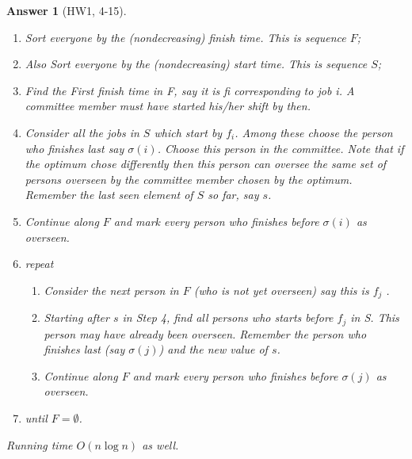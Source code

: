 \documentclass[11pt]{article}
\theoremstyle{numberplain}
\theoremstyle{nonumberplain}
\newtheorem{ans}{Answer}
\newcommand{\0}{{\mathbf{0}}}
\begin{document}
\begin{ans}[HW1, 4-15]

\begin{enumerate}
\item Sort everyone by the (nondecreasing) finish time. This is sequence $F$;
\item Also Sort everyone by the (nondecreasing) start time. This is sequence $S$;
\item Find the First finish time in F, say it is fi corresponding to job i. A committee member must have
started his/her shift by then.
\item Consider all the jobs in $S$ which start by $f_i$. Among these choose the person who finishes last say $\sigma(i)$.
Choose this person in the committee. Note that if the optimum chose differently then this person can
oversee the same set of persons overseen by the committee member chosen by the optimum. Remember
the last seen element of $S$ so far, say $s$.
\item  Continue along $F$ and mark every person who finishes before $\sigma(i)$ as overseen.
\item  repeat
\begin{enumerate}
\item Consider the next person in $F$ (who is not yet overseen) say this is $f_j$ .
\item Starting after $s$ in Step 4, find all persons who starts before $f_j$ in S. This person may have already
been overseen. Remember the person who finishes last (say $\sigma(j)$) and the new value of $s$.
\item Continue along $F$ and mark every person who finishes before $\sigma(j)$ as overseen.
\end{enumerate}
\item until $F =\emptyset $.
\end{enumerate}
Running time $O(n\log n)$ as well.
\end{ans}
\end{document}
